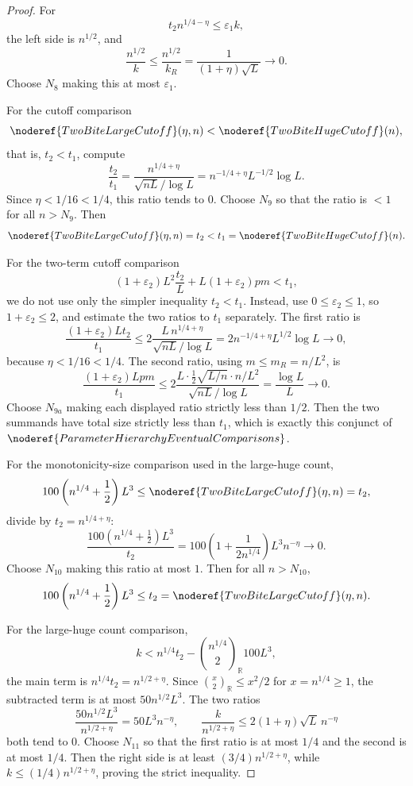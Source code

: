 \begin{proof}
For
\[
t_2n^{1/4-\eta}\le\varepsilon_1k,
\]
the left side is \(n^{1/2}\), and
\[
\frac{n^{1/2}}{k}\le \frac{n^{1/2}}{k_R}
=\frac{1}{(1+\eta)\sqrt L}\to0.
\]
Choose \(N_8\) making this at most \(\varepsilon_1\).

For the cutoff comparison
\[
\noderef{TwoBiteLargeCutoff}(\eta,n)<\noderef{TwoBiteHugeCutoff}(n),
\]
that is, \(t_2<t_1\), compute
\[
\frac{t_2}{t_1}
=\frac{n^{1/4+\eta}}{\sqrt{nL}/\log L}
=n^{-1/4+\eta}L^{-1/2}\log L.
\]
Since \(\eta<1/16<1/4\), this ratio tends to \(0\).  Choose \(N_9\) so that
the ratio is \(<1\) for all \(n>N_9\).  Then
\[
\noderef{TwoBiteLargeCutoff}(\eta,n)=t_2
<t_1=\noderef{TwoBiteHugeCutoff}(n).
\]

For the two-term cutoff comparison
\[
(1+\varepsilon_2)L^2\frac{t_2}{L}
  +L(1+\varepsilon_2)pm<t_1,
\]
we do not use only the simpler inequality \(t_2<t_1\).  Instead, use
\(0\le\varepsilon_2\le1\), so \(1+\varepsilon_2\le2\), and estimate the two
ratios to \(t_1\) separately.  The first ratio is
\[
\frac{(1+\varepsilon_2)Lt_2}{t_1}
\le
2\frac{L\,n^{1/4+\eta}}{\sqrt{nL}/\log L}
=2n^{-1/4+\eta}L^{1/2}\log L\to0,
\]
because \(\eta<1/16<1/4\).  The second ratio, using \(m\le m_R=n/L^2\), is
\[
\frac{(1+\varepsilon_2)Lpm}{t_1}
\le
2\frac{L\cdot\frac12\sqrt{L/n}\cdot n/L^2}
        {\sqrt{nL}/\log L}
=\frac{\log L}{L}\to0.
\]
Choose \(N_{9a}\) making each displayed ratio strictly less than \(1/2\).
Then the two summands have total size strictly less than \(t_1\), which is
exactly this conjunct of
\(\noderef{ParameterHierarchyEventualComparisons}\).

For the monotonicity-size comparison used in the large-huge count,
\[
100\left(n^{1/4}+\frac12\right)L^3
\le \noderef{TwoBiteLargeCutoff}(\eta,n)=t_2,
\]
divide by \(t_2=n^{1/4+\eta}\):
\[
\frac{100(n^{1/4}+\frac12)L^3}{t_2}
=100\left(1+\frac{1}{2n^{1/4}}\right)L^3n^{-\eta}\to0.
\]
Choose \(N_{10}\) making this ratio at most \(1\).  Then for all
\(n>N_{10}\),
\[
100\left(n^{1/4}+\frac12\right)L^3\le t_2
=\noderef{TwoBiteLargeCutoff}(\eta,n).
\]

For the large-huge count comparison,
\[
k<n^{1/4}t_2-\binom{n^{1/4}}{2}_{\mathbb R}100L^3,
\]
the main term is \(n^{1/4}t_2=n^{1/2+\eta}\).  Since
\(\binom{x}{2}_{\mathbb R}\le x^2/2\) for \(x=n^{1/4}\ge1\), the subtracted
term is at most \(50n^{1/2}L^3\).  The two ratios
\[
\frac{50n^{1/2}L^3}{n^{1/2+\eta}}=50L^3n^{-\eta},
\qquad
\frac{k}{n^{1/2+\eta}}\le 2(1+\eta)\sqrt L\,n^{-\eta}
\]
both tend to \(0\).  Choose \(N_{11}\) so that the first ratio is at most \(1/4\)
and the second is at most \(1/4\).  Then the right side is at least
\((3/4)n^{1/2+\eta}\), while \(k\le(1/4)n^{1/2+\eta}\), proving the strict
inequality.


\end{proof}
